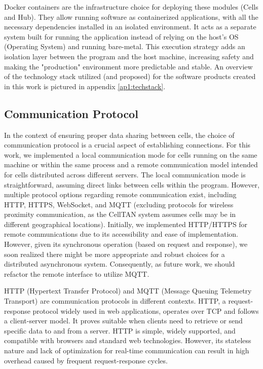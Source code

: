 Docker containers \cite{docker} are the infrastructure choice for deploying these modules (Cells and Hub). They allow running software as containerized applications, with all the necessary dependencies installed in an isolated environment. It acts as a separate system built for running the application instead of relying on the host's OS (Operating System) and running bare-metal. This execution strategy adds an isolation layer between the program and the host machine, increasing safety and making the "production" environment more predictable and stable. An overview of the technology stack utilized (and proposed) for the software products created in this work is pictured in appendix \ref{ap1:techstack}.


\subsection{Communication Protocol}

In the context of ensuring proper data sharing between cells, the choice of communication protocol is a crucial aspect of establishing connections. For this work, we implemented a local communication mode for cells running on the same machine or within the same process and a remote communication model intended for cells distributed across different servers. The local communication mode is straightforward, assuming direct links between cells within the program. However, multiple protocol options regarding remote communication exist, including HTTP, HTTPS, WebSocket, and MQTT (excluding protocols for wireless proximity communication, as the CellTAN system assumes cells may be in different geographical locations). Initially, we implemented HTTP/HTTPS for remote communications due to its accessibility and ease of implementation. However, given its synchronous operation (based on request and response), we soon realized there might be more appropriate and robust choices for a distributed asynchronous system. Consequently, as future work, we should refactor the remote interface to utilize MQTT.

HTTP (Hypertext Transfer Protocol) and MQTT (Message Queuing Telemetry Transport) are communication protocols in different contexts. HTTP, a request-response protocol widely used in web applications, operates over TCP and follows a client-server model. It proves suitable when clients need to retrieve or send specific data to and from a server. HTTP is simple, widely supported, and compatible with browsers and standard web technologies. However, its stateless nature and lack of optimization for real-time communication can result in high overhead caused by frequent request-response cycles.

